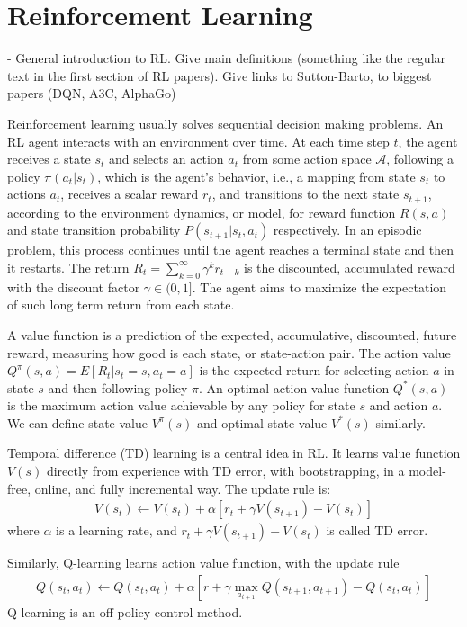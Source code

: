 \section{Reinforcement Learning}

- General introduction to RL. Give main definitions (something like the
regular text in the first section of RL papers). Give links to
Sutton-Barto, to biggest papers (DQN, A3C, AlphaGo)

Reinforcement learning usually solves sequential decision making problems. An RL agent interacts with an environment over time. At each time step $t$, the agent receives a state $s_t$ and selects an action $a_t$ from some action space $\mathcal{A}$, following a policy $\pi(a_t|s_t)$, which is the agent's behavior, i.e., a mapping from state $s_t$ to actions $a_t$, receives a scalar reward $r_t$, and transitions to the next state $s_{t+1}$, according to the environment dynamics, or model, for reward function $R(s,a)$ and state transition probability $P(s_{t+1}|s_t, a_t)$ respectively. In an episodic problem, this process continues until the agent reaches a terminal state and then it restarts. The return $R_t = \sum_{k=0}^{\infty} \gamma^k r_{t+k}$ is the discounted, accumulated reward with the discount factor $\gamma \in (0,1]$. The agent aims to maximize the expectation of such long term return from each state.     

A value function is a prediction of the expected, accumulative, discounted, future reward, measuring how good is each state, or state-action pair. The action value $Q^{\pi}(s, a) = E[R_t | s_t = s, a_t = a]$ is the expected return for selecting action $a$ in state $s$ and then following policy $\pi$. An optimal action value function $Q^{*}(s, a)$ is the maximum action value achievable by any policy for state $s$ and action $a$. We can define state value $V^{\pi}(s)$ and optimal state value $V^{*}(s)$ similarly.

Temporal difference (TD) learning is a central idea in RL. It learns value function $V(s)$ directly from experience with TD error, with bootstrapping, in a model-free, online, and fully incremental way. 
The update rule is:
\begin{align*}
 V(s_t) \leftarrow V(s_t) + \alpha [r_t + \gamma V(s_{t+1}) - V(s_t)]   
\end{align*}
where $\alpha$ is a learning rate, and $r_t + \gamma V(s_{t+1}) - V(s_t)$ is called TD error.

Similarly, Q-learning learns action value function, with the update rule
\begin{align*}
 Q(s_t, a_t) \leftarrow Q(s_t, a_t) + \alpha [r + \gamma \max_{a_{t+1}}Q(s_{t+1}, a_{t+1}) - Q(s_t,a_t)]   
\end{align*}
Q-learning is an off-policy control method.

